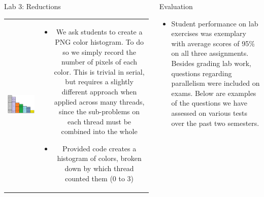 \documentclass[final,t]{beamer}
\begin{document}
\begin{frame}[fragile]{}
\begin{columns}[t]
\begin{column}{.3\linewidth}
\begin{block}{Lab 3: Reductions}
\begin{tabular}{cc}
                    \includegraphics[width=8.0in]{chart.png}
                &
                \begin{minipage}[b]{.6\textwidth}
                    \begin{itemize}
                        \item We ask students to create a PNG color histogram.
                            To do so we simply record the number of pixels of
                            each color.  This is trivial in serial, but requires
                            a slightly different approach when applied across
                            many threads, since the sub-problems on each thread
                            must be combined into the whole
                        \item Provided code creates a histogram of colors,
                            broken down by which thread counted them (0 to 3)
                    \end{itemize}
                \end{minipage} \\
            \end{tabular}
            \end{block}
        \end{column}
        \begin{column}{.3\linewidth}
            \begin{block}{Evaluation}

                \begin{itemize}
                    \item
                    Student performance on lab exercises was exemplary with
                    average scores of 95\% on all three assignments.  Besides
                    grading lab work, questions regarding parallelism were
                    included on exams. Below are examples of the questions we
                    have assessed on various tests over the past two semesters.


\end{itemize}
\end{block}
\end{column}
\end{columns}
\end{frame}
\end{document}
